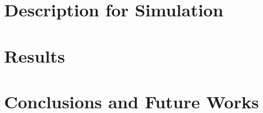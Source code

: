 \documentclass[10pt, a4paper]{article}
\begin{document}






\section{Description for Simulation}
\section{Results}
\section{Conclusions and Future Works}
\printbibliography
\end{document}
